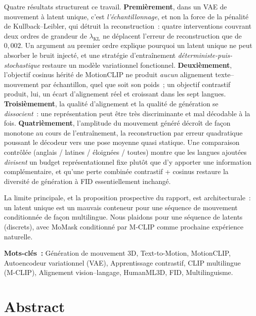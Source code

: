 \documentclass[12pt,a4paper,oneside]{report}
\theoremstyle{definition}
\theoremstyle{plain}
\newcommand{\lkl}{\ensuremath{\lambda_{\mathrm{KL}}}}
\begin{document}
Quatre résultats structurent ce travail. \textbf{Premièrement}, dans un VAE de
mouvement à latent unique, c'est \emph{l'échantillonnage}, et non la force de la
pénalité de Kullback--Leibler, qui détruit la reconstruction~: quatre
interventions couvrant deux ordres de grandeur de \lkl{} ne déplacent l'erreur
de reconstruction que de $0{,}002$. Un argument au premier ordre explique
pourquoi un latent unique ne peut absorber le bruit injecté, et une stratégie
d'entraînement \emph{déterministe-puis-stochastique} restaure un modèle
variationnel fonctionnel. \textbf{Deuxièmement}, l'objectif cosinus hérité de
MotionCLIP ne produit \emph{aucun} alignement texte--mouvement par échantillon,
quel que soit son poids~; un objectif contrastif produit, lui, un écart
d'alignement réel et croissant dans les sept langues. \textbf{Troisièmement}, la
qualité d'alignement et la qualité de génération se \emph{dissocient}~: une
représentation peut être très discriminante et mal décodable à la fois.
\textbf{Quatrièmement}, l'amplitude du mouvement généré décroît de façon
monotone au cours de l'entraînement, la reconstruction par erreur quadratique
poussant le décodeur vers une pose moyenne quasi statique. Une comparaison
contrôlée (anglais / latines / éloignées / toutes) montre que les langues
ajoutées \emph{divisent} un budget représentationnel fixe plutôt que d'y apporter
une information complémentaire, et qu'une perte combinée contrastif + cosinus
restaure la diversité de génération à FID essentiellement inchangé.

La limite principale, et la proposition prospective du rapport, est
architecturale~: un latent unique est un mauvais conteneur pour une séquence de
mouvement conditionnée de façon multilingue. Nous plaidons pour une séquence de
latents (discrets), avec MoMask conditionné par M-CLIP comme prochaine
expérience naturelle.

\vspace{0.6cm}
\noindent\textbf{Mots-clés~:} Génération de mouvement 3D, Text-to-Motion,
MotionCLIP, Autoencodeur variationnel (VAE), Apprentissage contrastif, CLIP
multilingue (M-CLIP), Alignement vision--langage, HumanML3D, FID, Multilinguisme.

\chapter*{Abstract}
\end{document}
